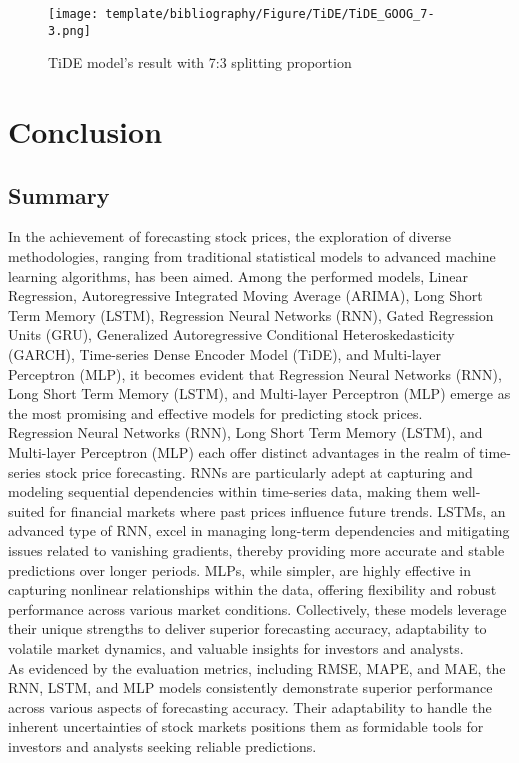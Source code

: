 \documentclass{ieeeojies}
\begin{document}
\begin{figure}[H]
  \centering
  \begin{minipage}{0.8\linewidth}
    \centering
        \texttt{[image: template/bibliography/Figure/TiDE/TiDE\_GOOG\_7-3.png]}
    \caption{TiDE model's result with 7:3 splitting proportion}
    \label{fig28}
  \end{minipage}
\end{figure}



\section{Conclusion}

\subsection{Summary}
In the achievement of forecasting stock prices, the exploration of diverse methodologies, ranging from traditional statistical models to advanced machine learning algorithms, has been aimed. Among the performed models, Linear Regression, Autoregressive Integrated Moving Average (ARIMA), Long Short Term Memory (LSTM), Regression Neural Networks (RNN), Gated Regression Units (GRU), Generalized Autoregressive Conditional Heteroskedasticity (GARCH), Time-series Dense Encoder Model (TiDE), and Multi-layer Perceptron (MLP), it becomes evident that Regression Neural Networks (RNN), Long Short Term Memory (LSTM), and Multi-layer Perceptron (MLP) emerge as the most promising and effective models for predicting stock prices.\\
Regression Neural Networks (RNN), Long Short Term Memory (LSTM), and Multi-layer Perceptron (MLP) each offer distinct advantages in the realm of time-series stock price forecasting. RNNs are particularly adept at capturing and modeling sequential dependencies within time-series data, making them well-suited for financial markets where past prices influence future trends. LSTMs, an advanced type of RNN, excel in managing long-term dependencies and mitigating issues related to vanishing gradients, thereby providing more accurate and stable predictions over longer periods. MLPs, while simpler, are highly effective in capturing nonlinear relationships within the data, offering flexibility and robust performance across various market conditions. Collectively, these models leverage their unique strengths to deliver superior forecasting accuracy, adaptability to volatile market dynamics, and valuable insights for investors and analysts.\\
As evidenced by the evaluation metrics, including RMSE, MAPE, and MAE, the RNN, LSTM, and MLP models consistently demonstrate superior performance across various aspects of forecasting accuracy. Their adaptability to handle the inherent uncertainties of stock markets positions them as formidable tools for investors and analysts seeking reliable predictions.
\end{document}
